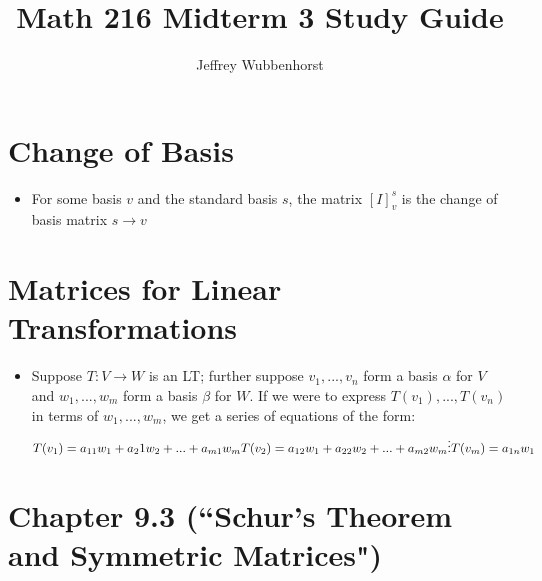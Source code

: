 \documentclass[10pt,letterpaper]{article}
\author{Jeffrey Wubbenhorst}
\title{Math 216 Midterm 3 Study Guide }
\begin{document}
\maketitle

\section{Change of Basis}

\begin{itemize}
\item For some basis $v$ and the standard basis $s$, the matrix $[I]^s_v$ is the change of basis matrix $s \to v
$

\end{itemize}

\section{Matrices for Linear Transformations}
\begin{itemize} 
\item Suppose $T: V\to W$ is an LT; further suppose $v_1, ...,v_n$ form a basis $\alpha$ for $V$ and $w_1, ..., w_m$ form a basis $\beta$ for $W$. If we were to express $T(v_1),...,T(v_n)$ in terms of 
$w_1,...,w_m$, we get a series of equations of the form: 
$$
T(v_1) =a_{11}w_1+a_21w_2+...+a_{m1}w_{m} \\
T(v_2) = a_{12}w_1+a_{22}w_2+...+a_{m2}w_m \\
\vdots \\
T(v_m)=a_{1n}w_1
$$

\end{itemize}

\section*{Chapter 9.3 (``Schur's Theorem and Symmetric Matrices")}
\end{document}
